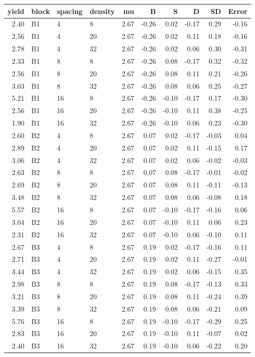 \documentclass[
]{book}
\begin{document}
\begin{tabular}{r|l|l|l|r|r|r|r|r|r}
\hline
yield & block & spacing & density & mu & B & S & D & SD & Error\\
\hline
2.40 & B1 & 4 & 8 & 2.67 & -0.26 & 0.02 & -0.17 & 0.29 & -0.16\\
\hline
2.56 & B1 & 4 & 20 & 2.67 & -0.26 & 0.02 & 0.11 & 0.18 & -0.16\\
\hline
2.78 & B1 & 4 & 32 & 2.67 & -0.26 & 0.02 & 0.06 & 0.30 & -0.31\\
\hline
2.33 & B1 & 8 & 8 & 2.67 & -0.26 & 0.08 & -0.17 & 0.32 & -0.32\\
\hline
2.56 & B1 & 8 & 20 & 2.67 & -0.26 & 0.08 & 0.11 & 0.21 & -0.26\\
\hline
3.03 & B1 & 8 & 32 & 2.67 & -0.26 & 0.08 & 0.06 & 0.25 & -0.27\\
\hline
5.21 & B1 & 16 & 8 & 2.67 & -0.26 & -0.10 & -0.17 & 0.17 & -0.30\\
\hline
2.56 & B1 & 16 & 20 & 2.67 & -0.26 & -0.10 & 0.11 & 0.38 & -0.25\\
\hline
1.90 & B1 & 16 & 32 & 2.67 & -0.26 & -0.10 & 0.06 & 0.23 & -0.30\\
\hline
2.60 & B2 & 4 & 8 & 2.67 & 0.07 & 0.02 & -0.17 & -0.03 & 0.04\\
\hline
2.89 & B2 & 4 & 20 & 2.67 & 0.07 & 0.02 & 0.11 & -0.15 & 0.17\\
\hline
3.06 & B2 & 4 & 32 & 2.67 & 0.07 & 0.02 & 0.06 & -0.02 & -0.03\\
\hline
2.63 & B2 & 8 & 8 & 2.67 & 0.07 & 0.08 & -0.17 & -0.01 & -0.02\\
\hline
2.69 & B2 & 8 & 20 & 2.67 & 0.07 & 0.08 & 0.11 & -0.11 & -0.13\\
\hline
3.48 & B2 & 8 & 32 & 2.67 & 0.07 & 0.08 & 0.06 & -0.08 & 0.18\\
\hline
5.57 & B2 & 16 & 8 & 2.67 & 0.07 & -0.10 & -0.17 & -0.16 & 0.06\\
\hline
3.04 & B2 & 16 & 20 & 2.67 & 0.07 & -0.10 & 0.11 & 0.06 & 0.23\\
\hline
2.31 & B2 & 16 & 32 & 2.67 & 0.07 & -0.10 & 0.06 & -0.10 & 0.11\\
\hline
2.67 & B3 & 4 & 8 & 2.67 & 0.19 & 0.02 & -0.17 & -0.16 & 0.11\\
\hline
2.71 & B3 & 4 & 20 & 2.67 & 0.19 & 0.02 & 0.11 & -0.27 & -0.01\\
\hline
3.44 & B3 & 4 & 32 & 2.67 & 0.19 & 0.02 & 0.06 & -0.15 & 0.35\\
\hline
2.98 & B3 & 8 & 8 & 2.67 & 0.19 & 0.08 & -0.17 & -0.13 & 0.33\\
\hline
3.21 & B3 & 8 & 20 & 2.67 & 0.19 & 0.08 & 0.11 & -0.24 & 0.39\\
\hline
3.39 & B3 & 8 & 32 & 2.67 & 0.19 & 0.08 & 0.06 & -0.21 & 0.09\\
\hline
5.76 & B3 & 16 & 8 & 2.67 & 0.19 & -0.10 & -0.17 & -0.29 & 0.25\\
\hline
2.83 & B3 & 16 & 20 & 2.67 & 0.19 & -0.10 & 0.11 & -0.07 & 0.02\\
\hline
2.40 & B3 & 16 & 32 & 2.67 & 0.19 & -0.10 & 0.06 & -0.22 & 0.20\\
\hline
\end{tabular}
\end{document}
